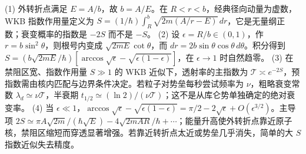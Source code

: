 (1) 外转折点满足 \(E=A/b\)，故 \(b=A/E\)。在 \(R<r<b\)，经典径向动量为虚数，WKB 指数作用量定义为 \(S=(1/\hbar)\int_R^b\sqrt{2m(A/r-E)}\,dr\)，它是无量纲正数；衰变概率的指数是 \(-2S\) 而不是 \(-S\)。
(2) 设 \(\epsilon=R/b\in(0,1)\)，作 \(r=b\sin^2\theta\)，则根号内变成 \(\sqrt{2mE}\cot\theta\)，而 \(dr=2b\sin\theta\cos\theta\,d\theta\)。积分得到 \(S=(b\sqrt{2mE}/\hbar)[\arccos\sqrt\epsilon-\sqrt{\epsilon(1-\epsilon)}]\)，在 \(\epsilon\to1\) 时自然趋零。
(3) 在禁阻区宽、指数作用量 \(S\gg1\) 的 WKB 近似下，透射率的主指数为 \(\mathcal T\asymp e^{-2S}\)，预指数需由核内匹配与边界条件决定。若粒子对势垒每秒尝试频率为 \(\nu\)，粗略衰变常数 \(\lambda_d\simeq\nu\mathcal T\)，半衰期 \(t_{1/2}\simeq(\ln2)/(\nu\mathcal T)\)；这不是从库仑势单独确定的绝对衰变率。
(4) 当 \(\epsilon\ll1\)，\(\arccos\sqrt\epsilon-\sqrt{\epsilon(1-\epsilon)}=\pi/2-2\sqrt\epsilon+O(\epsilon^{3/2})\)。主导项 \(2S\simeq\pi A\sqrt{2m}/(\hbar\sqrt E)-4\sqrt{2mAR}/\hbar+\cdots\)；能量升高使外转折点靠近原子核，禁阻区缩短而穿透显著增强。若靠近转折点太近或势垒几乎消失，简单的大 \(S\) 指数近似失去精度。
